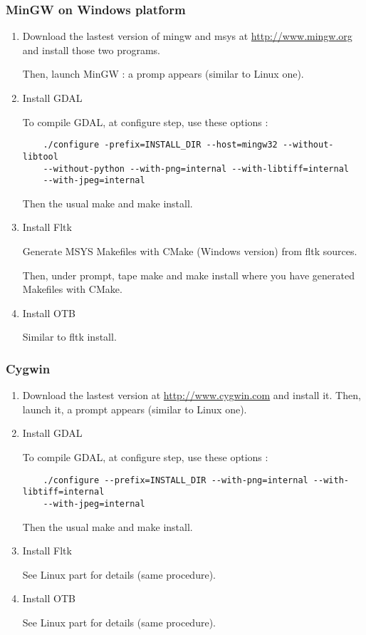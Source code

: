 \subsubsection{MinGW on Windows platform}
\begin{enumerate}

\item Download the lastest version of mingw and msys at \url{http://www.mingw.org} and install those 
	two programs.

	Then, launch MinGW : a promp appears (similar to Linux one).

\item Install GDAL

	To compile GDAL, at configure step, use these options :
\begin{verbatim}
	./configure -prefix=INSTALL_DIR --host=mingw32 --without-libtool 
	--without-python --with-png=internal --with-libtiff=internal
	--with-jpeg=internal
\end{verbatim}
	Then the usual make and make install.

\item Install Fltk

	Generate MSYS Makefiles with CMake (Windows version) from fltk sources.
	
	Then, under prompt, tape make and make install where you have generated Makefiles with CMake.

\item Install OTB

	Similar to fltk install.

\end{enumerate}

\subsubsection{Cygwin}
\begin{enumerate}

\item Download the lastest version at \url{http://www.cygwin.com} and install it.
	Then, launch it, a prompt appears (similar to Linux one).

\item Install GDAL

	To compile GDAL, at configure step, use these options :
\begin{verbatim}
	./configure --prefix=INSTALL_DIR --with-png=internal --with-libtiff=internal
	--with-jpeg=internal
\end{verbatim}
	Then the usual make and make install.

\item Install Fltk

	See Linux part for details (same procedure).

\item Install OTB

	See Linux part for details (same procedure).
\end{enumerate}

